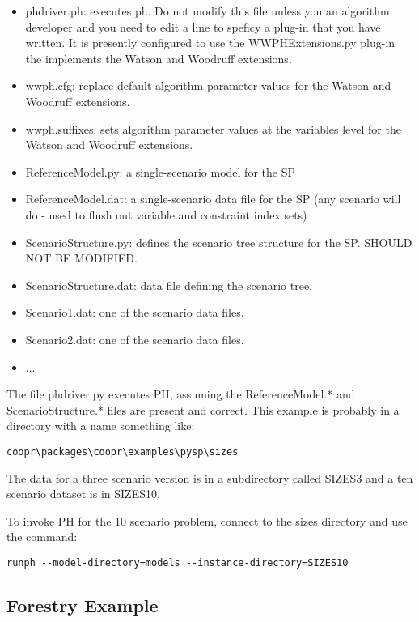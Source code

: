 \begin{itemize}
\item phdriver.ph: executes ph. Do not modify this file unless you an algorithm developer and you 
need to edit a line to speficy a plug-in that you have written. It is presently configured to use the WWPHExtensions.py plug-in the implements the Watson and Woodruff extensions.
\item wwph.cfg: replace default algorithm parameter values for the Watson and Woodruff extensions.
\item wwph.suffixes: sets algorithm parameter values at the variables level for the Watson and Woodruff extensions.
\item ReferenceModel.py: a single-scenario model for the SP
\item ReferenceModel.dat: a single-scenario data file for the SP (any scenario will do - used to flush out variable and constraint index sets)
\item ScenarioStructure.py: defines the scenario tree structure for the SP. SHOULD NOT BE MODIFIED.
\item ScenarioStructure.dat: data file defining the scenario tree.
\item Scenario1.dat: one of the scenario data files.
\item Scenario2.dat: one of the scenario data files.
\item ...
\end{itemize}

The file phdriver.py executes PH, assuming the ReferenceModel.* and ScenarioStructure.* files are present and correct. 
This example is probably in a directory with a name something like:

\begin{verbatim}
coopr\packages\coopr\examples\pysp\sizes
\end{verbatim}

The data for a three scenario version is in a subdirectory called SIZES3 and a ten scenario
dataset is in SIZES10.

To invoke PH for the 10 scenario problem, connect to the sizes directory and use the command:

\begin{verbatim}
runph --model-directory=models --instance-directory=SIZES10
\end{verbatim}


\subsection{Forestry Example}

